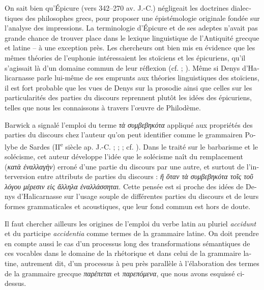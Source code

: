 \documentclass[french,output=paper,colorlinks,citecolor=brown]{../langscibook}
\begin{document}
\begin{otherlanguage}{french}
On sait bien qu’Épicure (vers 342–270 av. J.-C.) négligeait les doctrines dialectiques des philosophes grecs, pour proposer une épistémologie originale fondée sur l’analyse des impressions. La terminologie d’Épicure et de ses adeptes n’avait pas grande chance de trouver place dans le lexique linguistique de l’Antiquité grecque et latine – à une exception près. Les chercheurs ont bien mis en évidence que les mêmes théories de l’euphonie intéressaient les stoïciens et les épicuriens, qu’il s’agissait là d’un domaine commun de leur réflexion (cf. \citealt[181--182, 188--189]{Janko2000} ; \citealt[105--109]{Campbell2002}). Même si Denys d’Halicarnasse parle lui-même de ses emprunts aux théories linguistiques des stoïciens, il est fort probable que les vues de Denys sur la prosodie ainsi que celles sur les particularités des parties du discours reprennent plutôt les idées des épicuriens, telles que nous les connaissons à travers l’œuvre de Philodème.

Barwick a signalé l’emploi du terme \textit{τὰ συμβεβηκότα} appliqué aux propriétés des parties du discours chez l’auteur qu’on peut identifier comme le grammairen Polybe de Sardes (II\textsuperscript{e} siècle ap. J.-C. ;  ; \citealt[97]{Barwick1922} ; cf. \citealt{Jones1996}). Dans le traité sur le barbarisme et le solécisme, cet auteur développe l’idée que le solécisme naît du remplacement (\textit{κατὰ ἐναλλαγὴν}) erroné d’une partie du discours par une autre, et surtout de l’interversion entre attributs de parties du discours : \textit{ἢ ὅταν τὰ συμβεβηκότα τοῖς τοῦ λόγου μέρεσιν εἰς ἄλληλα ἐναλλάσσηται}. Cette pensée est si proche des idées de Denys d’Halicarnasse sur l’usage souple de différentes parties du discours et de leurs formes grammaticales et acoustiques, que leur fond commun est hors de doute. 

Il faut chercher ailleurs les origines de l’emploi du verbe latin au pluriel \textit{accidunt} et du participe \textit{accidentia} comme termes de la grammaire latine. On doit prendre en compte aussi le cas d’un processus long des transformations sémantiques de ces vocables dans le domaine de la rhétorique et dans celui de la grammaire latine, autrement dit, d’un processus à peu près parallèle à l’élaboration des termes de la grammaire grecque \textit{παρέπεται} et \textit{παρεπόμενα}, que nous avons esquissé ci-dessus.


\end{otherlanguage}
\end{document}
